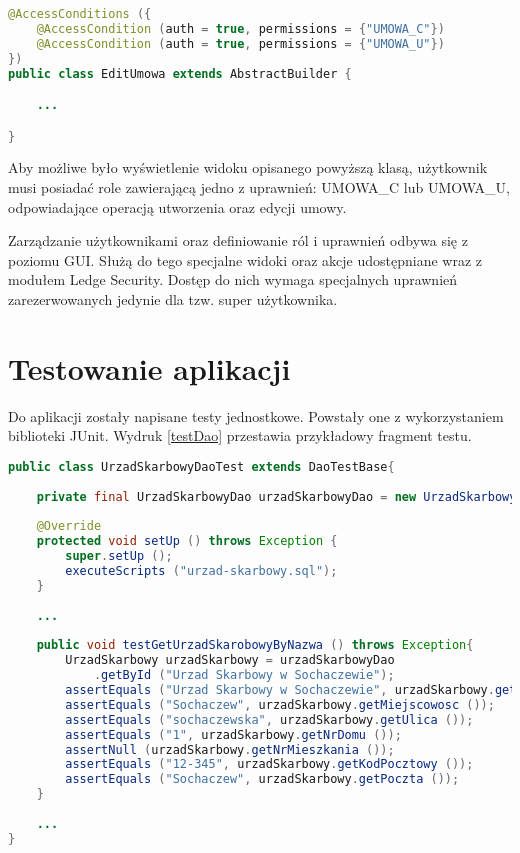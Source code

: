 \begin{lstlisting}[language=Java,style=outcode,showstringspaces=false,caption=Dostęp do widoku zabezpieczony za pomocą adnotacji,label={securityAnnotations}]
@AccessConditions ({
	@AccessCondition (auth = true, permissions = {"UMOWA_C"})
	@AccessCondition (auth = true, permissions = {"UMOWA_U"})
})
public class EditUmowa extends AbstractBuilder {

	...

}
\end{lstlisting}

Aby możliwe było wyświetlenie widoku opisanego powyższą klasą, użytkownik musi posiadać role zawierającą jedno z uprawnień: UMOWA\_C lub UMOWA\_U, odpowiadające operacją utworzenia oraz edycji umowy.

Zarządzanie użytkownikami oraz definiowanie ról i uprawnień odbywa się z poziomu GUI. Służą do tego specjalne widoki oraz akcje udostępniane wraz z modułem Ledge Security. Dostęp do nich wymaga specjalnych uprawnień zarezerwowanych jedynie dla tzw. super użytkownika.

\section[Testowanie aplikacji][Testowanie aplikacji]{Testowanie aplikacji}
Do aplikacji zostały napisane testy jednostkowe. Powstały one z wykorzystaniem biblioteki JUnit. Wydruk \ref{testDao} przestawia przykładowy fragment testu.

\begin{lstlisting}[language=Java,style=outcode,showstringspaces=false,caption=Test obiektu DAO,label={testDao}]
public class UrzadSkarbowyDaoTest extends DaoTestBase{
	
	private final UrzadSkarbowyDao urzadSkarbowyDao = new UrzadSkarbowyDao (context);
	
	@Override
	protected void setUp () throws Exception {
		super.setUp ();
		executeScripts ("urzad-skarbowy.sql");
	}
	
	...
	
	public void testGetUrzadSkarobowyByNazwa () throws Exception{	
		UrzadSkarbowy urzadSkarbowy = urzadSkarbowyDao
			.getById ("Urzad Skarbowy w Sochaczewie");
		assertEquals ("Urzad Skarbowy w Sochaczewie", urzadSkarbowy.getNazwa ());
		assertEquals ("Sochaczew", urzadSkarbowy.getMiejscowosc ());
		assertEquals ("sochaczewska", urzadSkarbowy.getUlica ());
		assertEquals ("1", urzadSkarbowy.getNrDomu ());
		assertNull (urzadSkarbowy.getNrMieszkania ());
		assertEquals ("12-345", urzadSkarbowy.getKodPocztowy ());
		assertEquals ("Sochaczew", urzadSkarbowy.getPoczta ());
	}
	
	...
}
\end{lstlisting}

